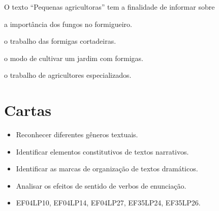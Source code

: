 O texto ``Pequenas agricultoras'' tem a finalidade de informar sobre

\begin{escolha}
\item a importância dos fungos no formigueiro.

\item o trabalho das formigas cortadeiras.

\item o modo de cultivar um jardim com formigas.

\item o trabalho de agricultores especializados.
\end{escolha}



\chapter{Cartas}




\begin{itemize}
\item Reconhecer diferentes gêneros textuais.

\item Identificar elementos constitutivos de textos narrativos.

\item Identificar as marcas de organização de textos dramáticos.

\item Analisar os efeitos de sentido de verbos de enunciação.
\end{itemize}



\begin{itemize}
	\item
EF04LP10, EF04LP14, EF04LP27, EF35LP24, EF35LP26.
\end{itemize}

